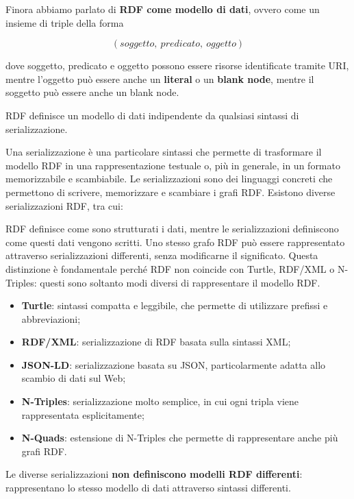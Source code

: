 Finora abbiamo parlato di \textbf{RDF come modello di dati}, ovvero come un insieme di triple della forma

$$
(soggetto,\ predicato,\ oggetto)
$$

dove soggetto, predicato e oggetto possono essere risorse identificate tramite URI, mentre l'oggetto può essere anche un \textbf{literal} o un \textbf{blank node}, mentre il soggetto può essere anche un blank node.

\begin{center}
    RDF definisce un modello di dati indipendente da qualsiasi sintassi di serializzazione.
\end{center}



Una serializzazione è una particolare sintassi che permette di trasformare il modello RDF in una rappresentazione testuale o, più in generale, in un formato memorizzabile e scambiabile.
Le serializzazioni sono dei linguaggi concreti che permettono di scrivere, memorizzare e scambiare i grafi RDF.
Esistono diverse serializzazioni RDF, tra cui:
\begin{warning}{}
    RDF definisce come sono strutturati i dati, mentre le serializzazioni definiscono come questi dati vengono scritti.
    Uno stesso grafo RDF può essere rappresentato attraverso serializzazioni differenti, senza modificarne il significato.
    Questa distinzione è fondamentale perché RDF non coincide con Turtle, RDF/XML o N-Triples: questi sono soltanto modi diversi di rappresentare il modello RDF.
\end{warning}
\begin{itemize}
\item \textbf{Turtle}: sintassi compatta e leggibile, che permette di utilizzare prefissi e abbreviazioni;
\item \textbf{RDF/XML}: serializzazione di RDF basata sulla sintassi XML;
\item \textbf{JSON-LD}: serializzazione basata su JSON, particolarmente adatta allo scambio di dati sul Web;
\item \textbf{N-Triples}: serializzazione molto semplice, in cui ogni tripla viene rappresentata esplicitamente;
\item \textbf{N-Quads}: estensione di N-Triples che permette di rappresentare anche più grafi RDF.
\end{itemize}

Le diverse serializzazioni \textbf{non definiscono modelli RDF differenti}: rappresentano lo stesso modello di dati attraverso sintassi differenti.

